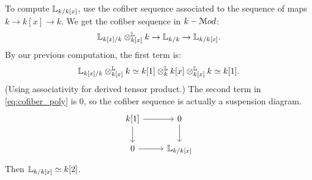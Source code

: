 To compute $\mathbb L_{k/k[x]}$, use the cofiber sequence associated to the sequence of maps $k \to k[x] \to k$. We get the
cofiber sequence in $k-\mathcal M od$:
\begin{equation}
\label{eq:cofiber_poly}
	\mathbb L_{k[x]/k} \otimes^{\mathbb L}_{k[x]} k \to \mathbb L_{k/k} \to \mathbb L_{k/k[x]}.
\end{equation}
By our previous computation, the first term is:
\[ \mathbb L_{k[x]/k} \otimes^{\mathbb L}_{k[x]} k \simeq k[1] \otimes_k^{\mathbb L} k[x] \otimes^{\mathbb L}_{k[x]} k \simeq k[1].	\]
(Using associativity for derived tensor product.) The second term in \ref{eq:cofiber_poly} is 0, so the cofiber sequence
is actually a suspension diagram. 
\[
\begin{tikzcd}
k[1]\arrow{r}\arrow{d} & 0\arrow{d} \\
0\arrow{r} & \bbL_{k/k[x]}
\end{tikzcd}
\]
Then $\mathbb L_{k/k[x]}\simeq k[2]$. 

